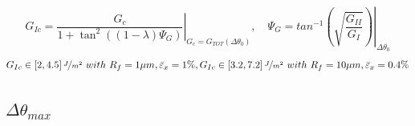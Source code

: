 \documentclass[first,firstsupp,lastsupp,last,hyperref,table]{ETHclass}
\begin{document}
\begin{frame}
\begin{columns}[c]
\begin{column}{0.5\textwidth}
\begin{figure}
\end{figure}
\end{column}
\end{columns}
\vspace{-0.2cm}
\scriptsize
\begin{equation*}
G_{Ic}=\left.\frac{G_{c}}{1+\tan^{2}\left(\left(1-\lambda\right)\Psi_{G}\right)}\right|_{G_{c}=G_{TOT}\left(\Delta\theta_{0}\right)},\quad\Psi_{G}=\left.tan^{-1}\left(\sqrt{\frac{G_{II}}{G_{I}}}\right)\right|_{\Delta\theta_{0}}
\end{equation*}
\begin{equation*}
G_{Ic}\in\left[2,4.5\right]\nicefrac{J}{m^{2}}\ with\ R_{f}=1\mu m,\bar{\varepsilon}_{x}=1\%, G_{Ic}\in\left[3.2,7.2\right]\nicefrac{J}{m^{2}}\ with\ R_{f}=10\mu m,\bar{\varepsilon}_{x}=0.4\%
\end{equation*}
\end{frame}

\subsection{$\Delta\theta_{max}$}

%
\end{document}
